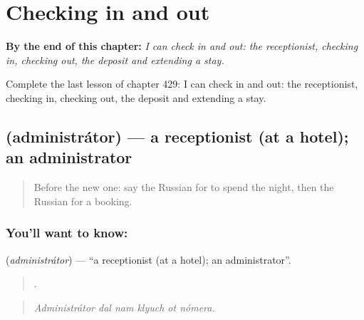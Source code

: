 
\chapter{Checking in and out}
\label{ch:ru-checking-in-and-out}

\begin{chapteropening}
\textbf{By the end of this chapter:} \emph{I can check in and out: the receptionist, checking in, checking out, the deposit and extending a stay.}

Complete the last lesson of chapter 429: I can check in and out: the receptionist, checking in, checking out, the deposit and extending a stay.
\end{chapteropening}

\section[\texorpdfstring{\ru{администратор} (administrátor)}{администратор (administrátor)}]{ (administrátor) — a receptionist (at a hotel); an administrator}

\label{lesson:RU-C429-administrator}



\begin{quote}
Before the new one: say the Russian for to spend the night, then the Russian for a booking.
\end{quote}

\subsection*{You'll want to know: }
\textbf{} (\emph{administrátor}) — \textquotedblleft{}a receptionist (at a hotel); an administrator\textquotedblright{}.

\begin{quote}
     .
\end{quote}

\begin{quote}
\emph{Administrátor dal nam klyuch ot nómera.}
\end{quote}

